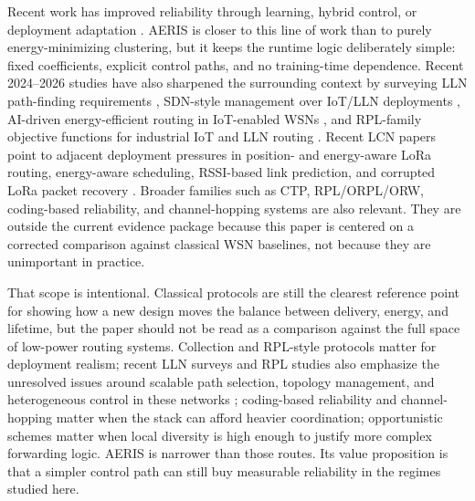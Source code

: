 \documentclass[letterpaper,conference]{IEEEtran}
\begin{document}
Recent work has improved reliability through learning, hybrid control, or deployment adaptation \cite{ren2024mefi,okine2024multi-agent,hu2024security,pushpa2025optimizing,jain2025optimized,elfouly2023environment-aware,dan2024accuracy-aware,bhukya2025hybrid,tossa2025wireless,singh2025enhanced,wang2024energy-efficient,zhang2025energy,manogaran2025developing,juwaied2025dl-heed}. AERIS is closer to this line of work than to purely energy-minimizing clustering, but it keeps the runtime logic deliberately simple: fixed coefficients, explicit control paths, and no training-time dependence. Recent 2024--2026 studies have also sharpened the surrounding context by surveying LLN path-finding requirements \cite{almutairi2024survey}, SDN-style management over IoT/LLN deployments \cite{djennadi2025exploring}, AI-driven energy-efficient routing in IoT-enabled WSNs \cite{thakur2025ai-driven}, and RPL-family objective functions for industrial IoT and LLN routing \cite{brito2026ec,habib2026edcc,cheppali2025hybrid}. Recent LCN papers point to adjacent deployment pressures in position- and energy-aware LoRa routing, energy-aware scheduling, RSSI-based link prediction, and corrupted LoRa packet recovery \cite{udugampola2025position,dorval2025energy,chatharajupalli2025probing,szafranski2025cec}. Broader families such as CTP, RPL/ORPL/ORW, coding-based reliability, and channel-hopping systems are also relevant. They are outside the current evidence package because this paper is centered on a corrected comparison against classical WSN baselines, not because they are unimportant in practice.

That scope is intentional. Classical protocols are still the clearest reference point for showing how a new design moves the balance between delivery, energy, and lifetime, but the paper should not be read as a comparison against the full space of low-power routing systems. Collection and RPL-style protocols matter for deployment realism; recent LLN surveys and RPL studies also emphasize the unresolved issues around scalable path selection, topology management, and heterogeneous control in these networks \cite{almutairi2024survey,djennadi2025exploring,brito2026ec,habib2026edcc,cheppali2025hybrid}; coding-based reliability and channel-hopping matter when the stack can afford heavier coordination; opportunistic schemes matter when local diversity is high enough to justify more complex forwarding logic. AERIS is narrower than those routes. Its value proposition is that a simpler control path can still buy measurable reliability in the regimes studied here.
\end{document}
